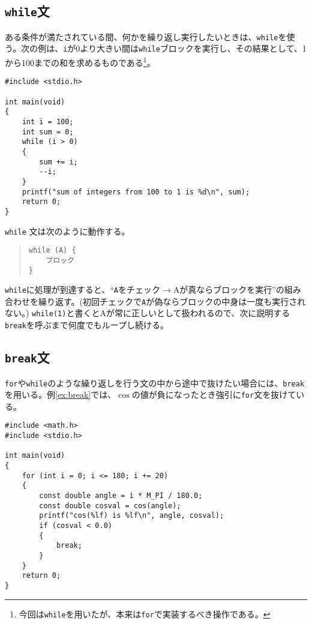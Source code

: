 \subsection{\texttt{while}文}
ある条件が満たされている間、何かを繰り返し実行したいときは、\texttt{while}を使う。次の例は、\texttt{i}が0より大きい間は\texttt{while}ブロックを実行し、その結果として、1から100までの和を求めるものである\footnote{今回は\texttt{while}を用いたが、本来は\texttt{for}で実装するべき操作である。}。
\begin{reidai}\label{ex:while}
    \begin{verbatim}
#include <stdio.h>

int main(void)
{
    int i = 100;
    int sum = 0;
    while (i > 0)
    {
        sum += i;
        --i;
    }
    printf("sum of integers from 100 to 1 is %d\n", sum);
    return 0;
}
\end{verbatim}
\end{reidai} \noindent
\texttt{while} 文は次のように動作する。
\begin{quote}
    \begin{verbatim}
while (A) {
    ブロック
}
\end{verbatim}
\end{quote}
\texttt{while}に処理が到達すると、``\texttt{A}をチェック\(\rightarrow\)Aが真ならブロックを実行''の組み合わせを繰り返す。(初回チェックで\texttt{A}が偽ならブロックの中身は一度も実行されない。)
\texttt{while(1)}と書くとAが常に正しいとして扱われるので、次に説明する\texttt{break}を呼ぶまで何度でもループし続ける。

\subsection{\texttt{break}文}
\texttt{for}や\texttt{while}のような繰り返しを行う文の中から途中で抜けたい場合には、\texttt{break}を用いる。例\ref{ex:break}では、\(\cos\)の値が負になったとき強引に\texttt{for}文を抜けている。
\begin{reidai}\label{ex:break}
    \begin{verbatim}
#include <math.h>
#include <stdio.h>

int main(void)
{
    for (int i = 0; i <= 180; i += 20)
    {
        const double angle = i * M_PI / 180.0;
        const double cosval = cos(angle);
        printf("cos(%lf) is %lf\n", angle, cosval);
        if (cosval < 0.0)
        {
            break;
        }
    }
    return 0;
}
\end{verbatim}
\end{reidai}

